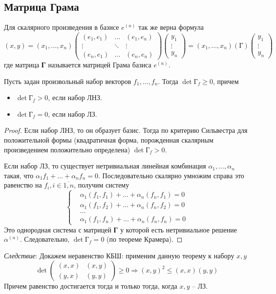 \subsection{Матрица Грама}
Для скалярного произведения в базисе  $e^{(n)}$ так же верна формула
\[
(x,y)=(x_1, \dots, x_n)\begin{pmatrix}
    (e_1,e_1) & \dots & (e_1,e_n) \\
    \vdots & \ddots & \vdots \\
    (e_n,e_1) & \dots & (e_n, e_n)
\end{pmatrix}\begin{pmatrix}
    y_1 \\
    \vdots \\
    y_n
\end{pmatrix}=(x_1, \dots, x_n)(\textbf{Г})\begin{pmatrix}
    y_1 \\
    \vdots \\
    y_n
\end{pmatrix}
\]
где матрица \textbf{Г} называется матрицей Грама базиса $e^{(n)}$.

\begin{theorem}
    Пусть задан произвольный набор векторов $f_1, \dots, f_n$. Тогда $\det \textbf{Г}_f\geqslant 0$, причем
    \begin{itemize}
        \item $\det \textbf{Г}_f > 0$, если набор ЛНЗ.
        \item $\det \textbf{Г}_f =0$, если набор ЛЗ.
    \end{itemize}
\end{theorem}
\begin{proof}
    Если набор ЛНЗ, то он образует базис. Тогда по критерию Сильвестра для положительной формы (квадратичная форма, порожденная скалярным произведением положительно определена) $\det \textbf{Г}_f >0$.

    Если набор ЛЗ, то существует нетривиальная линейная комбинация $\alpha_1, \dots, \alpha_n$ такая, что $\alpha_1f_1+\dots + \alpha_nf_n=0$. Последовательно скалярно умножим справа это равенство на $f_i, i\in\overline{1,n}$, получим систему
    \[
    \left\{
    \begin{aligned}
    &\alpha_1(f_1, f_1)+\dots+\alpha_n(f_n,f_1)=0\\
    &\alpha_1(f_1, f_2)+\dots+\alpha_n(f_n,f_2)=0\\
    &\dots\\
    &\alpha_1(f_1, f_n)+\dots+\alpha_n(f_n,f_n)=0
    \end{aligned}
    \right.
    \]
    Это однородная система с матрицей \textbf{Г} у которой есть нетривиальное решение $\alpha^{(n)}$. Следовательно, $\det \textbf{Г}_f=0$ (по теореме Крамера).
\end{proof}
\textit{Следствие}:\label{KBH proof} Докажем неравенство КБШ: применим данную теорему к набору $x, y$
\[
\det \begin{pmatrix}
    (x,x) & (x,y)\\
    (y,x) & (y,y)
\end{pmatrix} \geqslant 0 \Rightarrow (x,y)^2\leqslant(x,x)(y,y)
\]
Причем равенство достигается тогда и только тогда, когда $x,y$ -- ЛЗ.

